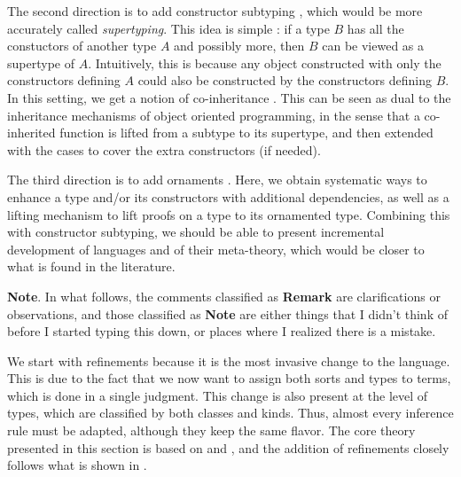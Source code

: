 \documentclass[letterpaper, 11pt]{article}
\begin{document}
    The second direction is to add constructor subtyping \cite{Poll1997, BarthesFrade1999}, which would be more accurately called \textit{supertyping}.
    This idea is simple : if a type $B$ has all the constuctors of another type $A$ and possibly more, then $B$ can be viewed as a supertype of $A$.
    Intuitively, this is because any object constructed with only the constructors defining $A$ could also be constructed by the constructors defining $B$.
    In this setting, we get a notion of co-inheritance \cite{Poll1997}.  This can be seen as dual to the inheritance mechanisms of object oriented programming,
    in the sense that a co-inherited function is lifted from a subtype to its supertype, and then extended with the cases to cover the extra constructors 
    (if needed).
    
    The third direction is to add ornaments \cite{McBride2011}.  Here, we obtain systematic ways to enhance a type and/or its constructors with 
    additional dependencies, as well as a lifting mechanism to lift proofs on a type to its ornamented type.  Combining this with constructor subtyping,
    we should be able to present incremental development of languages and of their meta-theory, which would be closer to what is found in the literature.

    \textbf{Note}. In what follows, the comments classified as \textbf{Remark} are clarifications or observations, and those classified as \textbf{Note} 
    are either things that I didn't think of before I started typing this down, or places where I realized there is a mistake.


    
    We start with refinements because it is the most invasive change to the language.  This is due to the fact that we now want to assign both sorts
    and types to terms, which is done in a single judgment.  This change is also present at the level of types, which are classified by both classes
    and kinds.  Thus, almost every inference rule must be adapted, although they keep the same flavor.  The core theory presented in this section is
    based on \cite{Pientka2008} and \cite{PientkaDunfield2008}, and the addition of refinements closely follows what is shown in \cite{LovasPfenning2010}.
\end{document}
